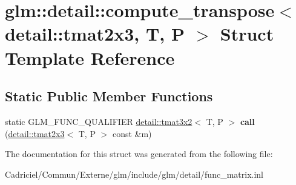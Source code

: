 \hypertarget{structglm_1_1detail_1_1compute__transpose_3_01detail_1_1tmat2x3_00_01_t_00_01_p_01_4}{}\section{glm\+:\+:detail\+:\+:compute\+\_\+transpose$<$ detail\+:\+:tmat2x3, T, P $>$ Struct Template Reference}
\label{structglm_1_1detail_1_1compute__transpose_3_01detail_1_1tmat2x3_00_01_t_00_01_p_01_4}
\subsection*{Static Public Member Functions}
\begin{DoxyCompactItemize}
\item 
static G\+L\+M\+\_\+\+F\+U\+N\+C\+\_\+\+Q\+U\+A\+L\+I\+F\+I\+ER \hyperlink{structglm_1_1detail_1_1tmat3x2}{detail\+::tmat3x2}$<$ T, P $>$ {\bfseries call} (\hyperlink{structglm_1_1detail_1_1tmat2x3}{detail\+::tmat2x3}$<$ T, P $>$ const \&m)\hypertarget{structglm_1_1detail_1_1compute__transpose_3_01detail_1_1tmat2x3_00_01_t_00_01_p_01_4_a4eb080988185ee66f639a17c9a6f548d}{}\label{structglm_1_1detail_1_1compute__transpose_3_01detail_1_1tmat2x3_00_01_t_00_01_p_01_4_a4eb080988185ee66f639a17c9a6f548d}

\end{DoxyCompactItemize}


The documentation for this struct was generated from the following file\+:\begin{DoxyCompactItemize}
\item 
Cadriciel/\+Commun/\+Externe/glm/include/glm/detail/func\+\_\+matrix.\+inl\end{DoxyCompactItemize}
